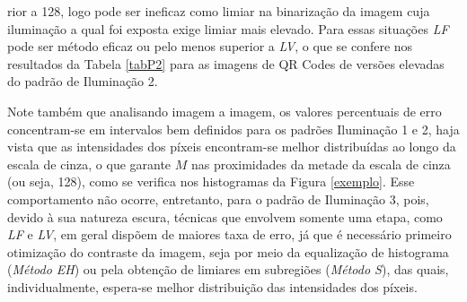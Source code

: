 \documentclass{ceel}
\begin{document}
\begin{multicols}{2}
\begin{minipage}[h]{\columnwidth}
\vspace{-0.1cm}
\caption{Imagens resultantes da Binarização em Sub-regiões para o QR Code 3 nos padrões de (a) Iluminação 1, (c) Iluminação 2 e (e) Iluminação 3, com suas respectivas imagens diferença em (b), (d) e (f).} \label{figS}
\end{minipage}

\vspace{0.4cm}
\noindent rior a 128, logo pode ser ineficaz como limiar na binarização da imagem cuja iluminação a qual foi exposta exige limiar mais elevado. Para essas situações \emph{LF} pode ser método eficaz ou pelo menos superior a \emph{LV}, o que se confere nos resultados da Tabela \ref{tabP2} para as imagens de QR Codes de versões elevadas do padrão de Iluminação 2.

Note também que analisando imagem a imagem, os valores percentuais de erro concentram-se em intervalos bem definidos para os padrões Iluminação 1 e 2, haja vista que as intensidades dos píxeis encontram-se melhor distribuídas ao longo da escala de cinza, o que garante $M$ nas proximidades da metade da escala de cinza (ou seja, 128), como se verifica nos histogramas da Figura \ref{exemplo}. Esse comportamento não ocorre, entretanto, para o padrão de Iluminação 3, pois, devido à sua natureza escura, técnicas que envolvem somente uma etapa, como \emph{LF} e \emph{LV}, em geral dispõem de maiores taxa de erro, já que é necessário primeiro otimização do contraste da imagem, seja por meio da equalização de histograma (\emph{Método EH}) ou pela obtenção de limiares em subregiões (\emph{Método S}), das quais, individualmente, espera-se melhor distribuição das intensidades dos píxeis.


\end{multicols}
\end{document}
